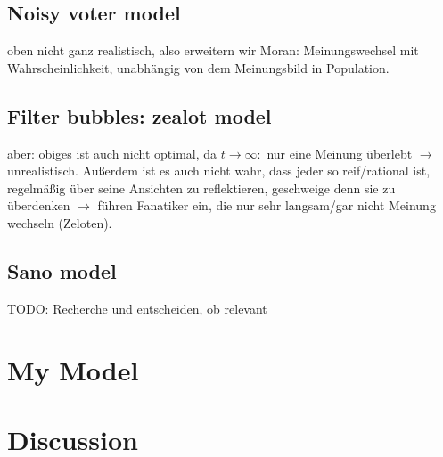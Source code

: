 \documentclass[12pt,a4paper,twoside]{article}
\begin{document}
\subsection{Noisy voter model}
oben nicht ganz realistisch, also erweitern wir Moran: Meinungswechsel mit Wahrscheinlichkeit, unabhängig von dem Meinungsbild in Population. 
\subsection{Filter bubbles: zealot model}
aber: obiges ist auch nicht optimal, da $t \rightarrow \infty:$ nur eine Meinung überlebt $\rightarrow$ unrealistisch. Außerdem ist es auch nicht wahr, dass jeder so reif/rational ist, regelmäßig über seine Ansichten zu reflektieren, geschweige denn sie zu überdenken $\rightarrow$ führen Fanatiker ein, die nur sehr langsam/gar nicht Meinung wechseln (Zeloten).
\subsection{Sano model}
TODO: Recherche und entscheiden, ob relevant %
\section{My Model}
\section{Discussion}

\newpage
\printbibliography
\end{document}
